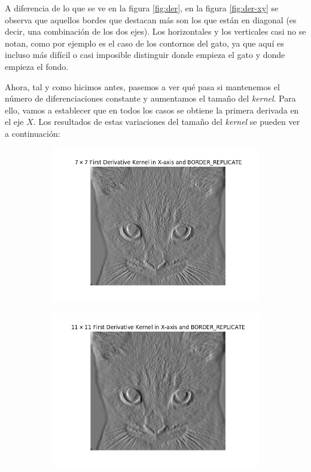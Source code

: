 \documentclass[11pt,a4paper]{article}
\begin{document}
A diferencia de lo que se ve en la figura \ref{fig:der}, en la figura \ref{fig:der-xy} se observa que aquellos bordes que
destacan más son los que están en diagonal (es decir, una combinación de los dos ejes). Los horizontales y los verticales
casi no se notan, como por ejemplo es el caso de los contornos del gato, ya que aquí es incluso más difícil o casi imposible
distinguir donde empieza el gato y donde empieza el fondo.

Ahora, tal y como hicimos antes, pasemos a ver qué pasa si mantenemos el número de diferenciaciones constante y aumentamos
el tamaño del \textit{kernel}. Para ello, vamos a establecer que en todos los casos se obtiene la primera derivada en el eje
$X$. Los resultados de estas variaciones del tamaño del \textit{kernel} se pueden ver a continuación:

\begin{figure}[H]
\begin{subfigure}{.5\textwidth}
	\centering
	\includegraphics[scale=0.46]{img/der-size1.png}
	\label{fig:der-size1}
\end{subfigure}
\begin{subfigure}{.5\textwidth}
	\centering
	\includegraphics[scale=0.46]{img/der-size2.png}

\end{subfigure}
\end{figure}
\end{document}

